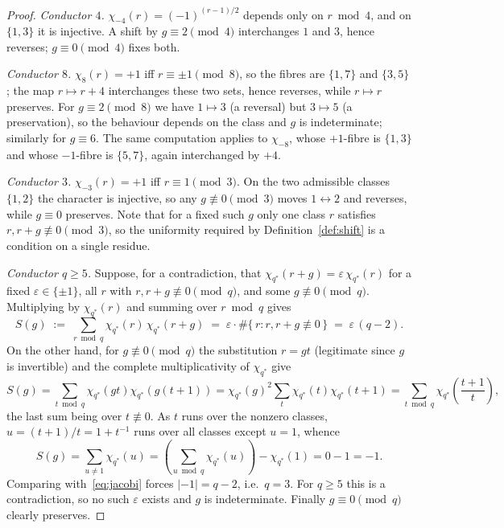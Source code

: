 \documentclass[11pt,reqno]{amsart}
\theoremstyle{plain}
\theoremstyle{definition}
\begin{document}
\begin{proof}
\emph{Conductor $4$.} $\chi_{-4}(r) = (-1)^{(r-1)/2}$ depends only on
$r \bmod 4$, and on $\{1,3\}$ it is injective. A shift by $g \equiv 2 \pmod 4$
interchanges $1$ and $3$, hence reverses; $g \equiv 0 \pmod 4$ fixes both.

\emph{Conductor $8$.} $\chi_8(r) = +1$ iff $r \equiv \pm 1 \pmod 8$, so the
fibres are $\{1,7\}$ and $\{3,5\}$; the map $r \mapsto r + 4$ interchanges these
two sets, hence reverses, while $r \mapsto r$ preserves. For $g \equiv 2
\pmod 8$ we have $1 \mapsto 3$ (a reversal) but $3 \mapsto 5$ (a preservation),
so the behaviour depends on the class and $g$ is indeterminate; similarly for
$g \equiv 6$. The same computation applies to $\chi_{-8}$, whose $+1$-fibre is
$\{1,3\}$ and whose $-1$-fibre is $\{5,7\}$, again interchanged by $+4$.

\emph{Conductor $3$.} $\chi_{-3}(r) = +1$ iff $r \equiv 1 \pmod 3$. On the two
admissible classes $\{1,2\}$ the character is injective, so any
$g \not\equiv 0 \pmod 3$ moves $1 \leftrightarrow 2$ and reverses, while
$g \equiv 0$ preserves. Note that for a fixed such $g$ only one class $r$
satisfies $r, r+g \not\equiv 0 \pmod 3$, so the uniformity required by
Definition~\ref{def:shift} is a condition on a single residue.

\emph{Conductor $q \ge 5$.} Suppose, for a contradiction, that
$\chi_{q^*}(r+g) = \varepsilon\, \chi_{q^*}(r)$ for a fixed $\varepsilon \in
\{\pm 1\}$, all $r$ with $r, r+g \not\equiv 0 \pmod q$, and some
$g \not\equiv 0 \pmod q$. Multiplying by $\chi_{q^*}(r)$ and summing over
$r \bmod q$ gives
\begin{equation}
\label{eq:jacobi}
  S(g) \;:=\; \sum_{r \bmod q} \chi_{q^*}(r)\,\chi_{q^*}(r+g)
        \;=\; \varepsilon \cdot \#\{\, r : r, r+g \not\equiv 0 \,\}
        \;=\; \varepsilon\,(q-2).
\end{equation}
On the other hand, for $g \not\equiv 0 \pmod q$ the substitution
$r = g t$ (legitimate since $g$ is invertible) and the complete
multiplicativity of $\chi_{q^*}$ give
\[
  S(g) = \sum_{t \bmod q} \chi_{q^*}(gt)\chi_{q^*}(g(t+1))
       = \chi_{q^*}(g)^2 \sum_{t} \chi_{q^*}(t)\chi_{q^*}(t+1)
       = \sum_{t \bmod q} \chi_{q^*}\!\left(\frac{t+1}{t}\right),
\]
the last sum being over $t \not\equiv 0$. As $t$ runs over the nonzero classes,
$u = (t+1)/t = 1 + t^{-1}$ runs over all classes except $u = 1$, whence
\[
  S(g) = \sum_{u \neq 1} \chi_{q^*}(u) = \left(\sum_{u \bmod q} \chi_{q^*}(u)\right) - \chi_{q^*}(1) = 0 - 1 = -1 .
\]
Comparing with~\eqref{eq:jacobi} forces $|{-1}| = q - 2$, i.e.\ $q = 3$. For
$q \ge 5$ this is a contradiction, so no such $\varepsilon$ exists and $g$ is
indeterminate. Finally $g \equiv 0 \pmod q$ clearly preserves.
\end{proof}
\end{document}
